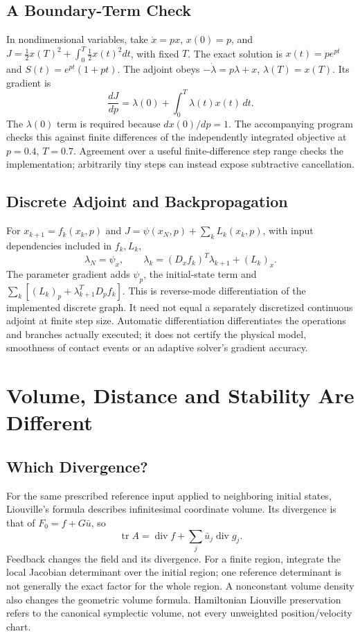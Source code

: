 \subsection{A Boundary-Term Check}

In nondimensional variables, take $\dot x=px$, $x(0)=p$, and $J=\tfrac12x(T)^2+\int_0^T\tfrac12x(t)^2dt$, with fixed $T$. The exact solution is $x(t)=pe^{pt}$ and $S(t)=e^{pt}(1+pt)$. The adjoint obeys $-\dot\lambda=p\lambda+x$, $\lambda(T)=x(T)$. Its gradient is
\begin{equation}
\frac{dJ}{dp}=\lambda(0)+\int_0^T\lambda(t)x(t)\,dt.
\end{equation}
The $\lambda(0)$ term is required because $dx(0)/dp=1$. The accompanying program checks this against finite differences of the independently integrated objective at $p=0.4$, $T=0.7$. Agreement over a useful finite-difference step range checks the implementation; arbitrarily tiny steps can instead expose subtractive cancellation.

\subsection{Discrete Adjoint and Backpropagation}

For $x_{k+1}=f_k(x_k,p)$ and $J=\psi(x_N,p)+\sum_k L_k(x_k,p)$, with input dependencies included in $f_k,L_k$,
\begin{equation}
\lambda_N=\psi_x,\qquad
\lambda_k=(D_xf_k)^T\lambda_{k+1}+(L_k)_x.
\end{equation}
The parameter gradient adds $\psi_p$, the initial-state term and $\sum_k[(L_k)_p+\lambda_{k+1}^T D_pf_k]$. This is reverse-mode differentiation of the implemented discrete graph. It need not equal a separately discretized continuous adjoint at finite step size. Automatic differentiation differentiates the operations and branches actually executed; it does not certify the physical model, smoothness of contact events or an adaptive solver's gradient accuracy.

\section{Volume, Distance and Stability Are Different}

\subsection{Which Divergence?}

For the same prescribed reference input applied to neighboring initial states, Liouville's formula describes infinitesimal coordinate volume. Its divergence is that of $F_0=f+G\bar u$, so
\begin{equation}
\operatorname{tr}A=\operatorname{div}f+
\sum_j\bar u_j\operatorname{div}g_j.
\end{equation}
Feedback changes the field and its divergence. For a finite region, integrate the local Jacobian determinant over the initial region; one reference determinant is not generally the exact factor for the whole region. A nonconstant volume density also changes the geometric volume formula. Hamiltonian Liouville preservation refers to the canonical symplectic volume, not every unweighted position/velocity chart.

